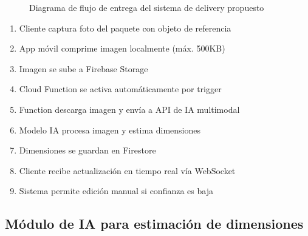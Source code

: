 \begin{figure}[htbp]
\caption{Diagrama de flujo de entrega del sistema de delivery propuesto}
\label{fig:callflow-delivery}
\end{figure}

\begin{enumerate}
    \item Cliente captura foto del paquete con objeto de referencia
    \item App móvil comprime imagen localmente (máx. 500KB)
    \item Imagen se sube a Firebase Storage
    \item Cloud Function se activa automáticamente por trigger
    \item Function descarga imagen y envía a API de IA multimodal
    \item Modelo IA procesa imagen y estima dimensiones
    \item Dimensiones se guardan en Firestore
    \item Cliente recibe actualización en tiempo real vía WebSocket
    \item Sistema permite edición manual si confianza es baja
\end{enumerate}

\subsection{Módulo de IA para estimación de dimensiones}

